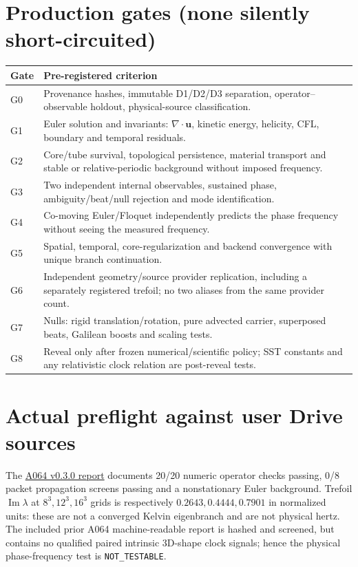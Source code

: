 \documentclass[11pt,a4paper]{article}
\begin{document}
\section{Production gates (none silently short-circuited)}
\begin{center}\small\begin{tabular}{p{12mm}p{137mm}}\toprule
Gate & Pre-registered criterion \\\midrule
G0 & Provenance hashes, immutable D1/D2/D3 separation, operator--observable holdout, physical-source classification.\\
G1 & Euler solution and invariants: $\nabla\cdot\mathbf u$, kinetic energy, helicity, CFL, boundary and temporal residuals.\\
G2 & Core/tube survival, topological persistence, material transport and stable or relative-periodic background without imposed frequency.\\
G3 & Two independent internal observables, sustained phase, ambiguity/beat/null rejection and mode identification.\\
G4 & Co-moving Euler/Floquet independently predicts the phase frequency without seeing the measured frequency.\\
G5 & Spatial, temporal, core-regularization and backend convergence with unique branch continuation.\\
G6 & Independent geometry/source provider replication, including a separately registered trefoil; no two aliases from the same provider count.\\
G7 & Nulls: rigid translation/rotation, pure advected carrier, superposed beats, Galilean boosts and scaling tests.\\
G8 & Reveal only after frozen numerical/scientific policy; SST constants and any relativistic clock relation are post-reveal tests.\\\bottomrule
\end{tabular}\end{center}

\section{Actual preflight against user Drive sources}
The \href{https://drive.google.com/file/d/1ET-KuARq9_TsgFszuqUflLXPnkW3vGIU/view}{A064 v0.3.0 report} documents 20/20 numeric operator checks passing, 0/8 packet propagation screens passing and a nonstationary Euler background. Trefoil $\operatorname{Im}\lambda$ at $8^3,12^3,16^3$ grids is respectively $0.2643, 0.4444, 0.7901$ in normalized units: these are not a converged Kelvin eigenbranch and are not physical hertz. The included prior A064 machine-readable report is hashed and screened, but contains no qualified paired intrinsic 3D-shape clock signals; hence the physical phase-frequency test is \texttt{NOT\_TESTABLE}.
\end{document}
